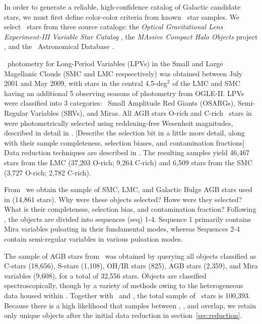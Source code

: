 In order to generate a reliable, high-confidence catalog of Galactic candidate \agb\, stars, we must first define color-color criteria from known \agb\, star samples. We select \agb\, stars from three source catalogs: the {\it Optical Gravitational Lens Experiment-III Variable Star Catalog} \citep[\ogle,][]{2008AcA....58...69U,2009AcA....59..239S,2011AcA....61..217S}, the {\it MAssive Compact Halo Objects} project \citep[\macho,][]{1997ApJ...482...89A}, and the \simbad\, Astronomical Database \citep{2000A&AS..143....9W}. 

\ogle\, photometry for Long-Period Variables (LPVs) in the Small and Large Magellanic Clouds (SMC and LMC respsectively) was obtained between July 2001 and May 2009, with stars in the central 4.5-deg$^2$ of the LMC and SMC having an additional 5 observing seasons of photometry from OGLE-II. LPVs were classified into 3 categories: \ogle\, Small Amplitude Red Giants (OSARGs), Semi-Regular Variables (SRVs), and Miras. All AGB stars  O-rich and C-rich \agb\, stars in \ogle\, were photometrically selected using reddening-free Wesenheit magnitudes, described in detail in \cite{2009AcA....59..239S,2011AcA....61..217S}. {\color{red}[Describe the selection bit in a little more detail, along with their sample completeness, selection biases, and contamination fractions]} Data reduction techniques are described in \cite{2008AcA....58...69U}. The resulting samples yield 46,467 \agb\, stars from the LMC (37,203 O-rich; 9,264 C-rich) and 6,509 stars from the SMC (3,727 O-rich; 2,782 C-rich). 

From \macho\, we obtain the sample of SMC, LMC, and Galactic Bulge AGB stars used in \cite{2008AJ....136.1242F} (14,861 stars). {\color{red}Why were these objects selected? Howe were they selected? What is their completeness, selection bias, and contamination fraction?} Following \cite{2008AJ....136.1242F}, the objects are divided into sequences (seq) 1-4. Sequence 1 primarily contains Mira variables pulsating in their fundamental modes, whereas Sequences 2-4 contain semi-regular variables in various pulsation modes.

The sample of AGB stars from \simbad\, was obtained by querying all objects classified as C-stars (18,656), S-stars (1,108), OH/IR stars (825), AGB stars (2,359), and Mira variables (9,608), for a total of 32,556 stars. Objects are classified spectroscopically, though by a variety of methods owing to the heterogeneous data housed within \simbad. Together with \macho\, and \ogle, the total sample of \agb\, stars is 100,393. Because there is a high likelihood that samples between \ogle, \macho, and \simbad overlap, we retain only unique objects after the initial data reduction in section~\ref{sec:reduction}.

